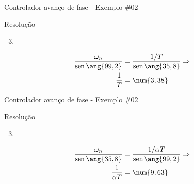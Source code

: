 \begin{frame}{Controlador avanço de fase - Exemplo \#02}
	\begin{block}{Resolução}
		\begin{enumerate}
			\setcounter{enumi}{2}
			\item 
		\end{enumerate}
		\begin{minipage}{0.5\linewidth}
			\centering
			
			\scalebox{0.8}{}
		\end{minipage}
		\hfill
		\begin{minipage}{0.4\linewidth}
			\centering
			
			\scalebox{0.7}{}
			
			\vspace{-0.7cm}
			\begin{align*}
			\dfrac{\omega_n}{\sen\ang{99,2}}&=\dfrac{1/T}{\sen\ang{35,8}} \Rightarrow\\
			\dfrac{1}{T}&=\num{3,38}
			\end{align*}
		\end{minipage}
	\end{block}
\end{frame}


\begin{frame}{Controlador avanço de fase - Exemplo \#02}
	\begin{block}{Resolução}
		\begin{enumerate}
			\setcounter{enumi}{2}
			\item 
		\end{enumerate}
		\begin{minipage}{0.5\linewidth}
			\centering
			
			\scalebox{0.8}{}
		\end{minipage}
		\hfill
		\begin{minipage}{0.4\linewidth}
			\centering
			
			\scalebox{0.8}{}
			
			\vspace{-0.5cm}
			\begin{align*}
			\dfrac{\omega_n}{\sen\ang{35,8}}&=\dfrac{1/\alpha T}{\sen\ang{99,2}}\Rightarrow\\
			\dfrac{1}{\alpha T}&=\num{9,63}
			\end{align*}
		\end{minipage}
	\end{block}
\end{frame}


